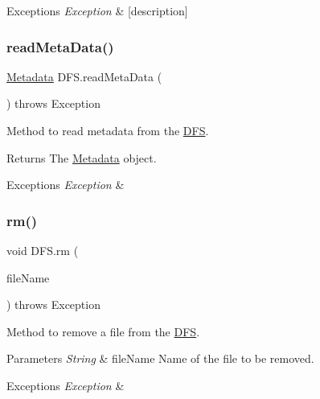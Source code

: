 \begin{DoxyExceptions}{Exceptions}
{\em Exception} & \mbox{[}description\mbox{]} \\
\hline
\end{DoxyExceptions}
\mbox{\label{class_d_f_s_a05df5c4a73e10460c29b14b46642eb8a}} 
\subsubsection{\texorpdfstring{read\+Meta\+Data()}{readMetaData()}}
{\footnotesize\ttfamily \hyperlink{class_metadata}{Metadata} D\+F\+S.\+read\+Meta\+Data (\begin{DoxyParamCaption}{ }\end{DoxyParamCaption}) throws Exception}

Method to read metadata from the \hyperlink{class_d_f_s}{D\+FS}. \begin{DoxyReturn}{Returns}
The \hyperlink{class_metadata}{Metadata} object. 
\end{DoxyReturn}

\begin{DoxyExceptions}{Exceptions}
{\em Exception} & \\
\hline
\end{DoxyExceptions}
\mbox{\label{class_d_f_s_a8e5dfe50eebc3c2131412cb35d8ec3f2}} 
\subsubsection{\texorpdfstring{rm()}{rm()}}
{\footnotesize\ttfamily void D\+F\+S.\+rm (\begin{DoxyParamCaption}\item[{String}]{file\+Name }\end{DoxyParamCaption}) throws Exception}

Method to remove a file from the \hyperlink{class_d_f_s}{D\+FS}. 
\begin{DoxyParams}{Parameters}
{\em String} & file\+Name Name of the file to be removed. \\
\hline
\end{DoxyParams}

\begin{DoxyExceptions}{Exceptions}
{\em Exception} & \\
\hline
\end{DoxyExceptions}
\mbox{\label{class_d_f_s_ac34aa133fcfaaf293e672b7574c599d6}} 
